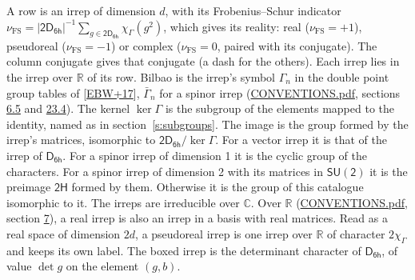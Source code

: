 \documentclass[10pt,a4paper]{article}
\numberwithin{equation}{section}
\newcommand{\grp}[1]{\mathsf{#1}}
\newcommand{\irchar}[1]{\chi_{#1}}
\newcommand{\fsind}{\nu_{\mathrm{FS}}}
\begin{document}
\leavevmode\label{n:index.frobenius}\label{n:head.irrep}\label{n:head.reality}A row is an irrep of dimension $d$, with its Frobenius--Schur indicator $\fsind = |\grp{2D_{6h}}|^{-1}\allowbreak\sum_{g\in\grp{2D_{6h}}}\irchar{\Gamma}(g^2)$, which gives its reality: real ($\fsind = +1$), pseudoreal ($\fsind = -1$) or complex ($\fsind = 0$, paired with its conjugate). \label{n:head.conjugate}The column conjugate gives that conjugate (a dash for the others). \label{n:head.over.real}Each irrep lies in the irrep over $\mathbb{R}$ of its row. \label{n:head.bilbao}\label{n:irrep.alias.gamma}Bilbao is the irrep's symbol $\Gamma_n$ in the double point group tables of [\href{../../../REFERENCES.pdf\#ref.EBW+17}{EBW+17}], $\bar{\Gamma}_n$ for a spinor irrep (\href{../../CONVENTIONS.pdf}{CONVENTIONS.pdf}, sections \href{../../../rotation/CONVENTIONS.pdf\#conv.6.5}{6.5} and \href{../../CONVENTIONS.pdf\#conv.23.4}{23.4}). \label{n:head.kernel}The kernel $\ker\Gamma$ is the subgroup of the elements mapped to the identity, named as in section~\ref{s:subgroups}. \label{n:head.image}The image is the group formed by the irrep's matrices, isomorphic to $\grp{2D_{6h}}/\ker\Gamma$. For a vector irrep it is that of the irrep of \href{../../../rotation/data/pdf/D6h.pdf}{$\grp{D_{6h}}$}. For a spinor irrep of dimension 1 it is the cyclic group of the characters. For a spinor irrep of dimension 2 with its matrices in $\grp{SU(2)}$ it is the preimage $\grp{2H}$ formed by them. Otherwise it is the group of this catalogue isomorphic to it. The irreps are irreducible over $\mathbb{C}$. Over $\mathbb{R}$ (\href{../../CONVENTIONS.pdf}{CONVENTIONS.pdf}, section \href{../../../rotation/CONVENTIONS.pdf\#conv.7}{7}), a real irrep is also an irrep in a basis with real matrices. Read as a real space of dimension $2d$, a pseudoreal irrep is one irrep over $\mathbb{R}$ of character $2\irchar{\Gamma}$ and keeps its own label. \label{n:mark.determinant}The boxed irrep is the determinant character of \href{../../../rotation/data/pdf/D6h.pdf}{$\grp{D_{6h}}$}, of value $\det g$ on the element $(g, b)$.
\setlength{\emergencystretch}{2em}\par\setlength{\emergencystretch}{0pt}
\end{document}
